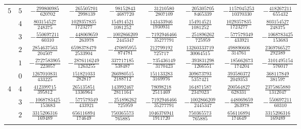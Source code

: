 \begin{table}
\begin{center}
\begin{tabular}{ccccccccc}
      $5$  &  $5$  &  $-\frac{ 299800985}{ 620702}$  &  $-\frac{ 265505701}{ 2998139}$  &  $-\frac{   98152843}{ 4687720}$  &  $-\frac{  31210580}{ 2807109}$  &  $-\frac{  205305705}{ 8465339}$  &  $-\frac{1157045253}{10370330} $  &  $-\frac{ 418267211}{ 655432}$  \\ \addlinespace
           &  $4$  &  $ \frac{ 803154527}{ 248375}$  &  $ \frac{1029357835}{ 1723277}$  &  $ \frac{  154914521}{ 1081252}$  &  $ \frac{ 143433946}{ 1930931}$  &  $ \frac{  154914521}{ 1081252}$  &  $ \frac{1029357835}{ 1723277} $  &  $ \frac{ 803154527}{ 248375}$  \\ \addlinespace
           &  $3$  &  $-\frac{ 550697211}{  60310}$  &  $-\frac{ 448069659}{  263978}$  &  $-\frac{ 1002866209}{ 2445347}$  &  $-\frac{7192946466}{35277791}$  &  $-\frac{  251896262}{  725959}$  &  $-\frac{ 577579349}{  433921} $  &  $-\frac{1068783425}{ 153683}$  \\ \addlinespace
           &  $2$  &  $ \frac{2854637563}{ 204507}$  &  $ \frac{6598378479}{ 2533904}$  &  $-\frac{  470895955}{  874781}$  &  $ \frac{ 212799192}{  725717}$  &  $ \frac{13260333719}{30064515}$  &  $ \frac{ 498890606}{  314761} $  &  $ \frac{2369766527}{ 292389}$  \\ \addlinespace
           &  $1$  &  $-\frac{2727583905}{ 223057}$  &  $-\frac{2876116249}{ 1263255}$  &  $ \frac{  337717185}{  538487}$  &  $-\frac{ 735436149}{ 3170423}$  &  $-\frac{  393831298}{ 1266551}$  &  $-\frac{ 185662673}{  174204} $  &  $-\frac{3101495154}{ 576017}$  \\ \addlinespace
           &  $0$  &  $ \frac{1267010831}{ 433225}$  &  $ \frac{ 151821033}{  282817}$  &  $ \frac{  266980515}{ 2188712}$  &  $ \frac{ 151133283}{ 3169976}$  &  $ \frac{  309673793}{ 5357421}$  &  $ \frac{ 393580372}{ 2049353} $  &  $ \frac{ 368117849}{ 381597}$  \\ \addlinespace
      $4$  &  $4$  &  $ \frac{ 412399715}{ 395812}$  &  $ \frac{ 265135851}{ 1336964}$  &  $ \frac{  143992467}{ 2811164}$  &  $ \frac{  78098218}{ 2511469}$  &  $ \frac{  164871587}{ 2347023}$  &  $ \frac{ 200564827}{  628331} $  &  $ \frac{2375865880}{1312047}$  \\ \addlinespace
           &  $3$  &  $-\frac{1068783425}{ 153683}$  &  $-\frac{ 577579349}{  433921}$  &  $-\frac{  251896262}{  725959}$  &  $-\frac{7192946466}{35277791}$  &  $-\frac{ 1002866209}{ 2445347}$  &  $-\frac{ 448069659}{  263978} $  &  $-\frac{ 550697211}{  60310}$  \\ \addlinespace
           &  $2$  &  $ \frac{3315206316}{ 169489}$  &  $ \frac{ 656116894}{  174649}$  &  $ \frac{  750365573}{  765885}$  &  $ \frac{1046376941}{ 1911720}$  &  $ \frac{  750365573}{  765885}$  &  $ \frac{ 656116894}{  174649} $  &  $ \frac{3315206316}{ 169489}$  \\ \addlinespace

\end{tabular}
\end{center}
\end{table}
